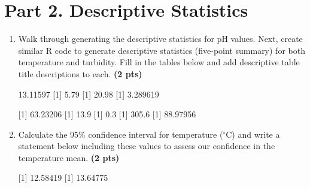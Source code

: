 \documentclass[12pt,letterpaper]{article}
\begin{document}
\section*{Part 2. Descriptive Statistics}
\begin{enumerate}[font=\bfseries, wide, resume]
    \item Walk through generating the descriptive statistics for pH values. Next, create similar R code to generate descriptive statistics (five-point summary) for both temperature and turbidity. Fill in the tables below and add descriptive table title descriptions to each. \textbf{(2 pts)}\par
    [1] 13.11597
    [1] 5.79
    [1] 20.98
    [1] 3.289619

    [1] 63.23206
    [1] 13.9
    [1] 0.3
    [1] 305.6
    [1] 88.97956 
    
    \item Calculate the 95\% confidence interval for temperature ($^\circ$C) and write a statement below including these values to assess our confidence in the temperature mean. \textbf{(2 pts)}\par 
    
    [1] 12.58419
    [1] 13.64775

\end{enumerate}
\end{document}
